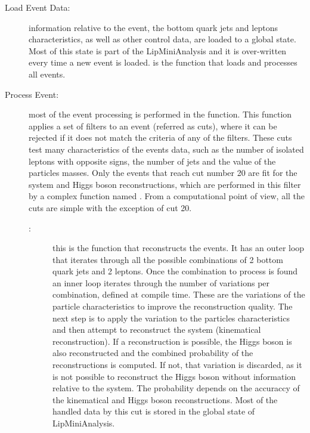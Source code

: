 \begin{description}
	\item[Load Event Data:] information relative to the event, the bottom quark jets and leptons characteristics, as well as other control data, are loaded to a global state. Most of this state is part of the LipMiniAnalysis and it is over-written every time a new event is loaded. \ttLoop is the function that loads and processes all events.
	\item[Process Event:] most of the event processing is performed in the \ttDoCuts function. This function applies a set of filters to an event (referred as cuts), where it can be rejected if it does not match the criteria of any of the filters. These cuts test many characteristics of the events data, such as the number of isolated leptons with opposite signs, the number of jets and the value of the particles masses. Only the events that reach cut number 20 are fit for the \ttbar system and Higgs boson reconstructions, which are performed in this filter by a complex function named \ttDilepKinFit. From a computational point of view, all the cuts are simple with the exception of cut 20.
	\begin{description}
		\item[\ttDilepKinFit:] this is the function that reconstructs the events. It has an outer loop that iterates through all the possible combinations of 2 bottom quark jets and 2 leptons. Once the combination to process is found an inner loop iterates through the number of variations per combination, defined at compile time. These are the variations of the particle characteristics to improve the reconstruction quality. The next step is to apply the variation to the particles characteristics and then attempt to reconstruct the \ttbar system (kinematical reconstruction). If a reconstruction is possible, the Higgs boson is also reconstructed and the combined probability of the reconstructions is computed. If not, that variation is discarded, as it is not possible to reconstruct the Higgs boson without information relative to the \ttbar system. The probability depends on the accuraccy of the kinematical and Higgs boson reconstructions. Most of the handled data by this cut is stored in the global state of LipMiniAnalysis.
	\end{description}
\end{description}

